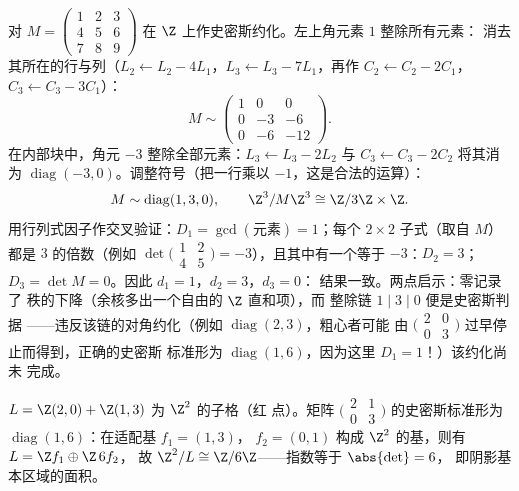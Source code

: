 \begin{example}[史密斯约化的完整实例]
\label{ex:b3:modules:smithworked}
对 $M = \begin{pmatrix} 1 & 2 & 3\\ 4 & 5 & 6\\ 7 & 8 & 9
\end{pmatrix}$ 在 $\Z$ 上作史密斯约化。左上角元素 $1$ 整除所有元素：
消去其所在的行与列（$L_2 \leftarrow L_2 - 4L_1$，$L_3
\leftarrow L_3 - 7L_1$，再作 $C_2 \leftarrow C_2 - 2C_1$，$C_3
\leftarrow C_3 - 3C_1$）：
\[
M \sim \begin{pmatrix} 1 & 0 & 0\\ 0 & -3 & -6\\ 0 & -6 & -12
\end{pmatrix} .
\]
在内部块中，角元 $-3$ 整除全部元素：$L_3
\leftarrow L_3 - 2L_2$ 与 $C_3 \leftarrow C_3 - 2C_2$ 将其消为
$\operatorname{diag}(-3, 0)$。调整符号（把一行乘以
$-1$，这是合法的运算）：
\[
M \sim \operatorname{diag}(1, 3, 0),
\qquad
\Z^3/M\Z^3 \cong \Z/3\Z \times \Z .
\]
用行列式因子作交叉验证：$D_1 =
\gcd(\text{元素}) = 1$；每个 $2\times2$ 子式（取自 $M$）都是
$3$ 的倍数（例如 $\det\bigl(\begin{smallmatrix}1 & 2\\ 4
& 5\end{smallmatrix}\bigr) = -3$），且其中有一个等于 $-3$：$D_2 =
3$；$D_3 = \det M = 0$。因此 $d_1 = 1$，$d_2 = 3$，$d_3 = 0$：
结果一致。两点启示：零记录了
秩的下降（余核多出一个自由的 $\Z$ 直和项），而
整除链 $1 \mid 3 \mid 0$ 便是史密斯判据
——违反该链的对角约化（例如
$\operatorname{diag}(2, 3)$，粗心者可能
由 $\bigl(\begin{smallmatrix}2 & 0\\ 0 &
3\end{smallmatrix}\bigr)$ 过早停止而得到，正确的史密斯
标准形为 $\operatorname{diag}(1, 6)$，因为这里 $D_1 = 1$！）该约化尚未
完成。
\end{example}

\begin{omfigure}

{\small $L = \Z(2,0) + \Z(1,3)$ 为 $\Z^2$ 的子格（红
点）。矩阵 $\bigl(\begin{smallmatrix} 2 &
1\\ 0 & 3\end{smallmatrix}\bigr)$ 的史密斯标准形为
$\operatorname{diag}(1, 6)$：在适配基 $f_1 = (1,3)$，
$f_2 = (0,1)$ 构成 $\Z^2$ 的基，则有 $L = \Z f_1 \oplus \Z\,6f_2$，
故 $\Z^2/L \cong \Z/6\Z$——指数等于 $\abs{\det} = 6$，
即阴影基本区域的面积。}
\end{omfigure}


